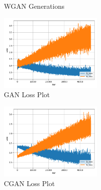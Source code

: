 \documentclass[conference]{IEEEtran}
\begin{document}
    \begin{figure}
        \caption{WGAN Generations}
        \label{fig:generation-wgan}
        \centering
    \end{figure}

    \begin{figure}
        \caption{GAN Loss Plot}
        \label{fig:loss-plot-gan}
        \includegraphics[width=0.45\textwidth]{GAN_loss.png}
        \centering
    \end{figure}

    \begin{figure}
        \caption{CGAN Loss Plot}
        \label{fig:loss-plot-cgan}
        \includegraphics[width=0.45\textwidth]{CGAN_loss.png}
        \centering
    \end{figure}
\end{document}
